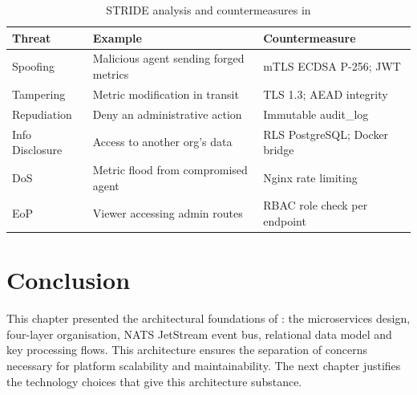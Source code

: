 \begin{table}[H]
\centering
\caption{STRIDE analysis and countermeasures in \caimp{}}
\label{tab:stride}
\small
\begin{tabularx}{\textwidth}{lXX}
\toprule
\textbf{Threat} & \textbf{Example} & \textbf{Countermeasure} \\
\midrule
Spoofing       & Malicious agent sending forged metrics     & mTLS ECDSA P-256; JWT \\
Tampering      & Metric modification in transit             & TLS 1.3; AEAD integrity \\
Repudiation    & Deny an administrative action              & Immutable audit\_log \\
Info Disclosure& Access to another org's data               & RLS PostgreSQL; Docker bridge \\
DoS            & Metric flood from compromised agent        & Nginx rate limiting \\
EoP            & Viewer accessing admin routes              & RBAC role check per endpoint \\
\bottomrule
\end{tabularx}
\end{table}

\section*{Conclusion}

This chapter presented the architectural foundations of \caimp{}: the microservices
design, four-layer organisation, NATS JetStream event bus, relational data model
and key processing flows. This architecture ensures the separation of concerns
necessary for platform scalability and maintainability. The next chapter justifies
the technology choices that give this architecture substance.

